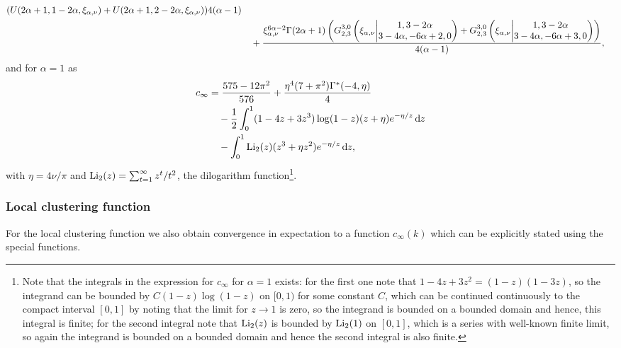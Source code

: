 \begin{theorem}
\begin{align*}
{		\left(U(2\alpha+1,1-2\alpha,\xi_{\alpha,\nu}) + U(2\alpha+1,2-2\alpha,\xi_{\alpha,\nu})\right)}{4(\alpha-1)} \\
	&\hspace{10pt}+ \frac{\xi_{\alpha,\nu}^{6\alpha - 2} \Gamma(2\alpha+1)\left( 	
		\MeijerGnew{3}{0}{2}{3}{1,3-2\alpha}{3-4\alpha,-6\alpha+2,0}{\xi_{\alpha,\nu}}
		+ \MeijerGnew{3}{0}{2}{3}{1,3-2\alpha}{3-4\alpha,-6\alpha+3,0}{\xi_{\alpha,\nu}}\right)}{4(\alpha-1)},
\end{align*}
and for $\alpha = 1$ as
\begin{align*}
	c_\infty &= \frac{575 - 12 \pi^2}{576} + \frac{\eta^4(7 + \pi^2)\Gamma^\ast(-4, \eta)}{4}\\
	&\hspace{10pt}- \frac{1}{2} \int_0^1 (1 - 4z + 3z^3)\log(1-z)(z + \eta)e^{-\eta/z} \dd z\\
	&\hspace{10pt}- \int_0^1 \Li_2(z)(z^3 + \eta z^2) e^{-\eta/z} \dd z,		
\end{align*}
with $\eta = 4\nu/\pi$ and $\Li_2(z) = \sum_{t = 1}^\infty z^t/t^2$, the dilogarithm function\footnote{Note that the integrals in the expression for $c_\infty$ for $\alpha = 1$ exists: for the first one note that $1-4z+3z^2=(1-z)(1-3z)$, so the integrand can be bounded by $C(1-z)\log(1-z)$ on $[0,1)$ for some constant $C$, which can be continued continuously to the compact interval $[0,1]$ by noting that the limit for $z \rightarrow 1$ is zero, so the integrand is bounded on a bounded domain and hence, this integral is finite; for the second integral note that $\Li_2(z)$ is bounded by $\Li_2(1)$ on $[0,1]$, which is a series with well-known finite limit, so again the integrand is bounded on a bounded domain and hence the second integral is also finite.}.
\end{theorem}


\subsubsection{Local clustering function}

For the local clustering function we also obtain convergence in expectation to a function $c_\infty(k)$ which can be explicitly stated using the special functions.

